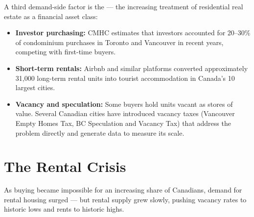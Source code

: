 A third demand-side factor is the  ---
the increasing treatment of residential real estate as a financial asset class:

\begin{itemize}
  \item \textbf{Investor purchasing:} CMHC estimates that investors
        accounted for 20--30\% of condominium purchases in Toronto and
        Vancouver in recent years, competing with first-time buyers.

  \item \textbf{Short-term rentals:} Airbnb and similar platforms converted
        approximately 31{,}000 long-term rental units into tourist
        accommodation in Canada's 10 largest cities.

  \item \textbf{Vacancy and speculation:} Some buyers hold units vacant
        as stores of value. Several Canadian cities have introduced vacancy
        taxes (Vancouver Empty Homes Tax, BC Speculation and Vacancy Tax)
        that address the problem directly and generate data to measure its scale.
\end{itemize}

\section{The Rental Crisis}
\label{sec:rental_crisis}

As buying became impossible for an increasing share of Canadians, demand
for rental housing surged --- but rental supply grew slowly, pushing vacancy
rates to historic lows and rents to historic highs.

